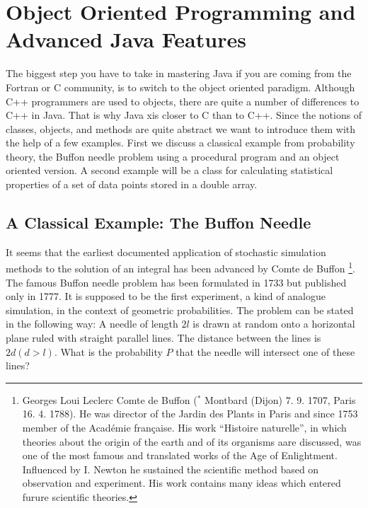 \chapter[Object Oriented Programming]{Object Oriented Programming and Advanced Java Features}
\label{sec:objectoriented}

The biggest step you have to take in mastering Java if you are
coming from the Fortran or C community, is to switch to the object
oriented paradigm. Although C++ programmers are used to objects, there
are quite a number of differences to C++ in Java. That is why Java
xis closer to C than to C++. Since the notions of classes, objects, and
methods are quite abstract we want to introduce them with the help of
a few examples. First we discuss a classical example from probability theory,
the Buffon needle problem using a procedural program and an object oriented version.
A second example will be a class for calculating 
statistical properties of a set of data points stored in a double array.  


\section{A Classical Example: The Buffon Needle}

It seems that the earliest documented application of stochastic simulation
methods to the solution of an integral has been advanced by Comte de
Buffon \footnote{Georges Loui Leclerc Comte de Buffon ($^*$ Montbard
  (Dijon) 7. 9. 1707, \dag Paris 16. 4. 1788). He was director of the
  Jardin des Plants in Paris and since 1753 member of the Acad\'emie 
fran\c{c}aise. His  work ``Histoire naturelle'', in which theories
about the origin of the earth and of  its organisms aare discussed,
was one of the most famous and translated works of the Age of
Enlightment. Influenced by I. Newton he sustained the scientific
method based on observation and experiment. His work contains many
ideas which entered furure scientific theories.}. The famous Buffon
needle problem has been formulated in 1733 but published only in 1777. It is
supposed
to be the first experiment, a kind of analogue simulation, in the
context of geometric probabilities. The problem can be stated in the
following way: A needle of length $2l$ is drawn at random onto a
horizontal plane ruled with straight parallel lines. The distance
between the lines is $2d (d>l)$. 
What is the probability $P$ that the
needle will intersect one of these lines?

